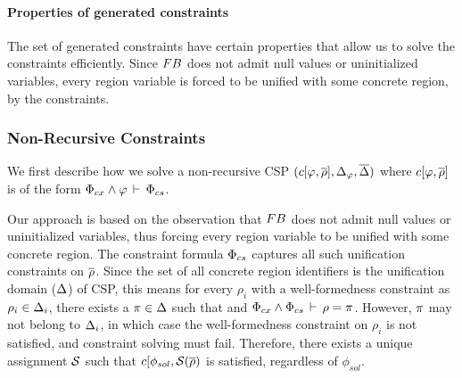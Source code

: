 \paragraph{Properties of generated constraints}
The set of generated constraints have certain properties that allow us to
solve the constraints efficiently.
%
Since ${\sc FB}$ does not admit null values or uninitialized variables, every region
variable is forced to be unified with some concrete region, by the constraints.

\subsubsection{Non-Recursive Constraints}
\label{sec:csolve}

We first describe how we solve a non-recursive CSP $(c\lbrack \varphi,\overline{\rho} \rbrack,\Delta_{\varphi},\overline{\Delta})$ where
$c\lbrack \varphi,\overline{\rho} \rbrack$ is of the form $\Phi_{cx}
\wedge \varphi\,\vdash\,\Phi_{cs}$. 

Our approach is based on the observation that ${\sc FB}$ does not admit
null values or uninitialized variables, thus forcing every region
variable to be unified with some concrete region.
%
The constraint formula $\Phi_{cs}$ captures all such unification constraints on $\overline{\rho}$.
Since the set of all concrete region identifiers is the
unification domain ($\Delta$) of CSP, this means for every $\rho_i$
with a well-formedness constraint as $\rho_i \in \Delta_i$, there
exists a $\pi \in \Delta$ such that and $\Phi_{cx} \wedge
\Phi_{cs}\,\vdash\,\rho = \pi$. However, $\pi$ may not belong to $\Delta_i$,
in which case the well-formedness constraint on $\rho_i$ is not
satisfied, and constraint solving must fail.  Therefore, there exists
a unique assignment $\mathcal{S}$ such that $c\lbrack
\phi_{sol},\mathcal{S}(\overline{\rho})$ is satisfied, regardless of
$\phi_{sol}$.

